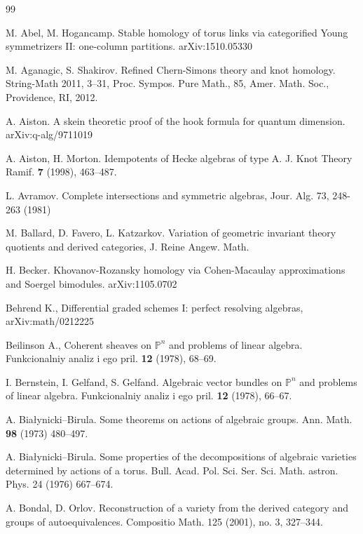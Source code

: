 \documentclass[12pt]{amsart}
\numberwithin{equation}{section}
\theoremstyle{definition}
\theoremstyle{remark}
\newcommand{\PP}{\mathbb{P}}
\renewcommand{\1}{\mathbf{1}}
\begin{document}
\begin{thebibliography}{99}

 M. Abel, M. Hogancamp. Stable homology of torus links via categorified Young symmetrizers II: one-column partitions.
 arXiv:1510.05330

 M. Aganagic, S. Shakirov. Refined Chern-Simons theory and knot homology. String-Math 2011, 3--31, Proc. Sympos. Pure Math., 85, Amer. Math. Soc., Providence, RI, 2012.

 A. Aiston. A skein theoretic proof of the hook formula for quantum dimension.
arXiv:q-alg/9711019

 A. Aiston, H. Morton. Idempotents of Hecke algebras of type A.
J. Knot Theory Ramif. {\bf 7} (1998), 463--487.  

 L. Avramov. Complete intersections and symmetric algebras, 
Jour. Alg. 73, 248-263 (1981) 


 M. Ballard, D. Favero, L. Katzarkov. Variation of geometric invariant theory quotients and derived categories, J. Reine Angew. Math.

 H. Becker. Khovanov-Rozansky homology via Cohen-Macaulay approximations and Soergel bimodules. arXiv:1105.0702

 Behrend K., Differential graded schemes I: perfect resolving algebras, arXiv:math/0212225

 Beilinson A., Coherent sheaves on $\PP^n$ and problems of linear algebra. Funkcionalniy analiz
i ego pril. {\bf 12} (1978), 68--69.

 I. Bernstein, I. Gelfand, S. Gelfand. Algebraic vector bundles on $\PP^n$ and problems of
linear algebra. Funkcionalniy analiz
i ego pril. {\bf 12} (1978), 66--67. 

 A. Bia\l ynicki--Birula. Some theorems on actions of algebraic groups. Ann. Math. {\bf 98} (1973) 480--497.

 A. Bia\l ynicki--Birula. Some properties of the decompositions of algebraic varieties determined by actions of
a torus. Bull. Acad. Pol. Sci. Ser. Sci. Math. astron. Phys. 24 (1976) 667--674.

 A. Bondal, D. Orlov. Reconstruction of a variety from the derived category and groups of autoequivalences. Compositio Math. 125 (2001), no. 3, 327--344.


\end{thebibliography}
\end{document}
